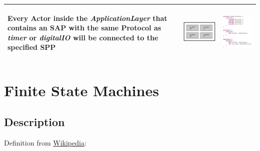 \begin{table}
\begin{tabular}{|m{3cm}|c|c|}
 \begin{flushleft}Every Actor inside the \textit{ApplicationLayer} that contains an SAP with the same 
Protocol as \textit{timer} or \textit{digitalIO} will be connected to the specified SPP\end{flushleft} & 
\includegraphics[scale=0.5]{images/040-LayeringApplicationLayer.png} & 
\includegraphics[scale=0.5]{images/040-LayeringApplicationLayerTextual.png} \\ \hline
\end{tabular}
\end{table}

\section{Finite State Machines}

\subsection{Description}

Definition from \href{http://en.wikipedia.org/wiki/Finite-state\_machine}{Wikipedia}:

